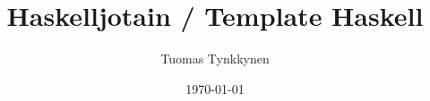 \documentclass[finnish]{tktltiki2/tktltiki2}
\title{Haskelljotain / Template Haskell}
\author{Tuomas Tynkkynen}
\date{\today}
\theoremstyle{definition}
\theoremstyle{remark}
\begin{document}


\frontmatter      %
\maketitle        %
\makeabstract     %

\tableofcontents  %


\mainmatter


%
%
% 
%

% 
% 



\end{document}
